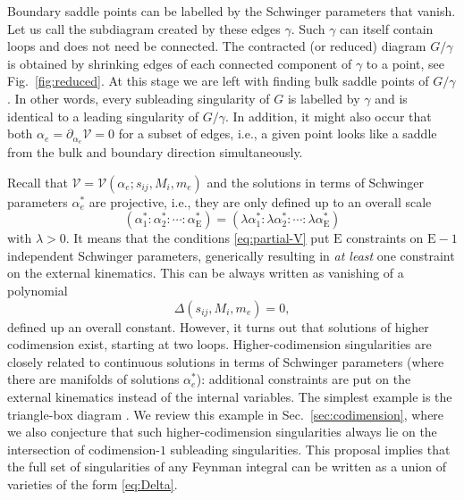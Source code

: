 \documentclass[12pt]{article}
\numberwithin{figure}{section}
\def \be {\begin{equation}}
\def \ee {\end{equation}}
\def \E {\mathrm{E}}
\def \V {\mathcal{V}}
\begin{document}
    Boundary saddle points can be labelled by the Schwinger parameters that vanish.  Let us call the subdiagram created by these edges $\gamma$. Such $\gamma$ can itself contain loops and does not need be connected. The contracted (or reduced) diagram $G/\gamma$ is obtained by shrinking edges of each connected component of $\gamma$ to a point, see Fig.~\ref{fig:reduced}. At this stage we are left with finding bulk saddle points of $G/\gamma$. In other words, every subleading singularity of $G$ is labelled by $\gamma$ and is identical to a leading singularity of $G/\gamma$. In addition, it might also occur that both $\alpha_e = \partial_{\alpha_e} \V = 0$ for a subset of edges, i.e., a given point looks like a saddle from the bulk and boundary direction simultaneously.
    
    Recall that $\V = \V(\alpha_e; s_{ij}, M_i, m_e)$ and the solutions in terms of Schwinger parameters $\alpha_e^\ast$ are projective, i.e., they are only defined up to an overall scale
    \be
    (\alpha_1^\ast : \alpha_2^\ast : \cdots : \alpha_\E^\ast) = (\lambda\alpha_1^\ast : \lambda\alpha_2^\ast : \cdots : \lambda\alpha_\E^\ast)
    \ee
    with $\lambda > 0$. It means that the conditions \eqref{eq:partial-V} put $\E$ constraints on $\E{-}1$ independent Schwinger parameters, generically resulting in \emph{at least} one constraint on the external kinematics. This can be always written as vanishing of a polynomial
    \be\label{eq:Delta}
    \Delta(s_{ij}, M_i, m_e) = 0,
    \ee
    defined up an overall constant.
    However, it turns out that solutions of higher codimension exist, starting at two loops. Higher-codimension singularities are closely related to continuous solutions in terms of Schwinger parameters (where there are manifolds of solutions $\alpha_e^\ast$): additional constraints are put on the external kinematics instead of the internal variables. The simplest example is the triangle-box diagram \cite{Mizera:2021ujs}. We review this example in Sec.~\ref{sec:codimension}, where we also conjecture that such higher-codimension singularities always lie on the intersection of codimension-$1$ subleading singularities. This proposal implies that the full set of singularities of any Feynman integral can be written as a union of varieties of the form \eqref{eq:Delta}.
    
    
    
\end{document}
